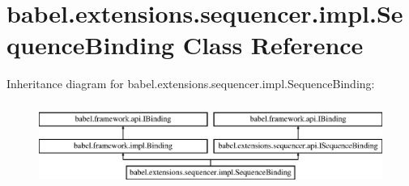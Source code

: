 \hypertarget{classbabel_1_1extensions_1_1sequencer_1_1impl_1_1_sequence_binding}{\section{babel.\-extensions.\-sequencer.\-impl.\-Sequence\-Binding Class Reference}
\label{classbabel_1_1extensions_1_1sequencer_1_1impl_1_1_sequence_binding}
}
Inheritance diagram for babel.\-extensions.\-sequencer.\-impl.\-Sequence\-Binding\-:\begin{figure}[H]
\begin{center}
\leavevmode
\includegraphics[height=2.754098cm]{classbabel_1_1extensions_1_1sequencer_1_1impl_1_1_sequence_binding}
\end{center}
\end{figure}
